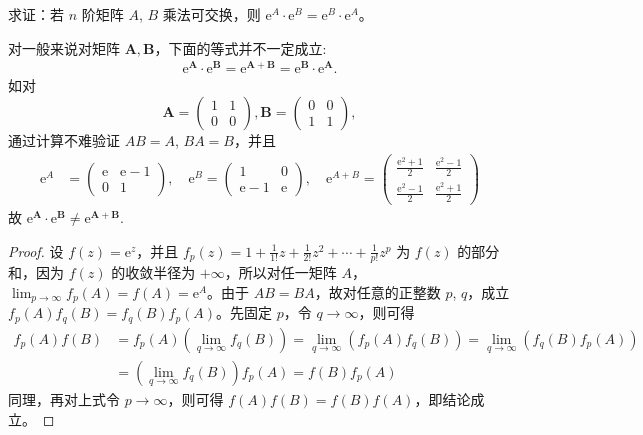 \documentclass[../../main.tex]{subfiles}%
\begin{document}
\begin{proposition}\label{proposition:若A,B乘法可交换,则e^A,e^B也乘法可交换}
求证：若 $n$ 阶矩阵 $A$, $B$ 乘法可交换，则 $\mathrm{e}^A\cdot\mathrm{e}^B = \mathrm{e}^B\cdot\mathrm{e}^A$。
\end{proposition}
\begin{remark}
对一般来说对矩阵 $\boldsymbol{A},\boldsymbol{B}$，下面的等式并不一定成立:
\begin{align*}
\mathrm{e}^{\boldsymbol{A}}\cdot\mathrm{e}^{\boldsymbol{B}}=\mathrm{e}^{\boldsymbol{A}+\boldsymbol{B}}=\mathrm{e}^{\boldsymbol{B}}\cdot\mathrm{e}^{\boldsymbol{A}}.
\end{align*}
如对
\[
\boldsymbol{A}=\begin{pmatrix}
1 & 1 \\
0 & 0
\end{pmatrix}, \boldsymbol{B}=\begin{pmatrix}
0 & 0 \\
1 & 1
\end{pmatrix},
\]
通过计算不难验证 $AB = A$, $BA = B$，并且
\begin{align*}
\mathrm{e}^A &= 
\begin{pmatrix}
\mathrm{e} & \mathrm{e} - 1 \\
0 & 1
\end{pmatrix}, \quad
\mathrm{e}^B = 
\begin{pmatrix}
1 & 0 \\
\mathrm{e} - 1 & \mathrm{e}
\end{pmatrix}, \quad
\mathrm{e}^{A + B} = 
\begin{pmatrix}
\frac{\mathrm{e}^2 + 1}{2} & \frac{\mathrm{e}^2 - 1}{2} \\
\frac{\mathrm{e}^2 - 1}{2} & \frac{\mathrm{e}^2 + 1}{2}
\end{pmatrix}
\end{align*} 
故
$\mathrm{e}^{\boldsymbol{A}}\cdot\mathrm{e}^{\boldsymbol{B}}\neq\mathrm{e}^{\boldsymbol{A}+\boldsymbol{B}}$. 
\end{remark}
\begin{proof}

设 $f(z)=\mathrm{e}^z$，并且 $f_p(z)=1+\frac{1}{1!}z+\frac{1}{2!}z^2+\cdots+\frac{1}{p!}z^p$ 为 $f(z)$ 的部分和，因为 $f(z)$ 的收敛半径为 $+\infty$，所以对任一矩阵 $A$，$\lim_{p\to\infty}f_p(A)=f(A)=\mathrm{e}^A$。由于 $AB = BA$，故对任意的正整数 $p$, $q$，成立 $f_p(A)f_q(B)=f_q(B)f_p(A)$。先固定 $p$，令 $q\to\infty$，则可得
\begin{align*}
f_p(A)f(B) &= f_p(A)\left(\lim_{q\to\infty}f_q(B)\right)=\lim_{q\to\infty}\left(f_p(A)f_q(B)\right)=\lim_{q\to\infty}\left(f_q(B)f_p(A)\right)\\
&=\left(\lim_{q\to\infty}f_q(B)\right)f_p(A)=f(B)f_p(A)
\end{align*}
同理，再对上式令 $p\to\infty$，则可得 $f(A)f(B)=f(B)f(A)$，即结论成立。 

\end{proof}
\end{document}
